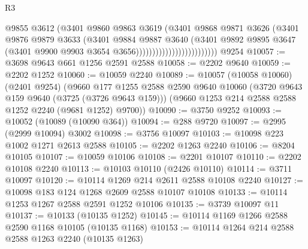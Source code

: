 \begin{lexlean}{R3}
\begin{coremodule}
                                          @9855
                                          @3612
                                          (@3401
                                            @9860
                                            @9863
                                            @3619
                                            (@3401
                                              @9868
                                              @9871
                                              @3626
                                              (@3401
                                                @9876
                                                @9879
                                                @3633
                                                (@3401
                                                  @9884
                                                  @9887
                                                  @3640
                                                  (@3401
                                                    @9892
                                                    @9895
                                                    @3647
                                                    (@3401
                                                      @9900
                                                      @9903
                                                      @3654
                                                      @3656)))))))))))))))))))))))))
    @9254
@10057 := @3698 @9643 @661 @1256 @2591 @2588
@10058 := @2202 @9640
@10059 := @2202 @1252
@10060 := @10059 @2240
@10089 := @10057
    (@10058 @10060)
    (@2401 @9254)
    (@9660
      @177
      @1255
      @2588
      @2590
      @9640
      @10060
      (@3720 @9643 @159 @9640 (@3725 (@3726 @9643 @159)))
      (@9660 @1253 @214 @2588 @2588 @1252 @2240 (@9681 @1252) @9700))
@10090 := @3750 @9252
@10093 := @10052 (@10089 (@10090 @364))
@10094 := @288 @9720
@10097 := @2995 (@2999 @10094) @3002
@10098 := @3756 @10097
@10103 := @10098 @223 @1002 @1271 @2613 @2588
@10105 := @2202 @1263 @2240
@10106 := @8204 @10105
@10107 := @10059 @10106
@10108 := @2201 @10107
@10110 := @2202 @10108 @2240
@10113 := @10103 @10110 (@2426 @10110)
@10114 := @3711 @10097
@10120 := @10114 @1269 @214 @2611 @2588 @10108 @2240
@10127 := @10098 @183 @124 @1268 @2609 @2588 @10107 @10108
@10133 := @10114 @1253 @1267 @2588 @2591 @1252 @10106
@10135 := @3739 @10097 @11
@10137 := @10133 (@10135 @1252)
@10145 := @10114 @1169 @1266 @2588 @2590 @1168 @10105 (@10135 @1168)
@10153 := @10114 @1264 @214 @2588 @2588 @1263 @2240 (@10135 @1263)

\end{coremodule}
\end{lexlean}
